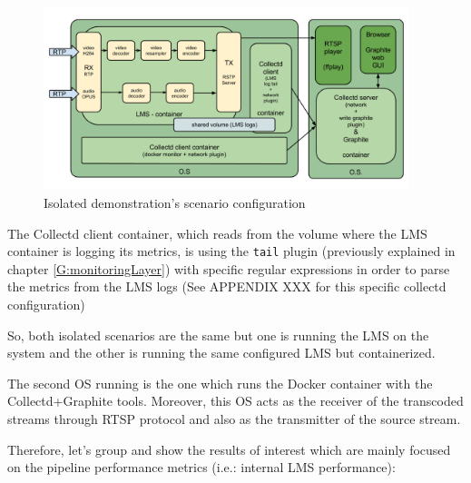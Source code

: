 \begin{figure}[!htb]
\begin{center}
\includegraphics[width=0.95\textwidth]{./images/isolatedScenario.png}
\caption{Isolated demonstration's scenario configuration}
\label{F:idsc}
\end{center}
\end{figure}

The Collectd client container, which reads from the volume where the LMS container is logging its metrics, is using the \texttt{tail} plugin (previously explained in chapter \ref{G:monitoringLayer}) with specific regular expressions in order to parse the metrics from the LMS logs (See APPENDIX XXX for this specific collectd configuration)

So, both isolated scenarios are the same but one is running the LMS on the system and the other is running the same configured LMS but containerized.

The second OS running is the one which runs the Docker container with the Collectd+Graphite tools. Moreover, this OS acts as the receiver of the transcoded streams through RTSP protocol and also as the transmitter of the source stream.

Therefore, let's group and show the results of interest which are mainly focused on the pipeline performance metrics (i.e.: internal LMS performance):

